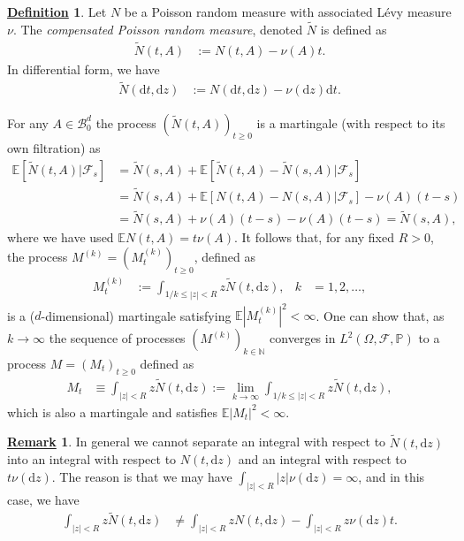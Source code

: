 \documentclass[12pt]{book}
\numberwithin{equation}{chapter}
\theoremstyle{plain}
\numberwithin{theorem}{section}
\theoremstyle{definition}
\newtheorem{definition}[theorem]{\underline{Definition}}
\newtheorem{remark}[theorem]{\underline{Remark}}
\numberwithin{exercise}{chapter}
\newcommand{\<}{\langle}
\renewcommand{\>}{\rangle}
\renewcommand{\(}{\left(}
\renewcommand{\)}{\right)}
\renewcommand{\[}{\left[}
\renewcommand{\]}{\right]}
\newcommand\Eb{\mathds{E}}
\newcommand\Pb{\mathds{P}}
\newcommand\Nb{\mathds{N}}
\newcommand\Bc{\mathscr{B}}
\newcommand\Fc{\mathscr{F}}
\newcommand\Om{\Omega}
\newcommand\Nt{\widetilde{N}}
\newcommand\dd{\mathrm{d}}
\begin{document}
\begin{definition}
Let $N$ be a Poisson random measure with associated L\'evy measure $\nu$.  The \emph{compensated Poisson random measure}, denoted $\Nt$ is defined as
\begin{align}
\Nt( t , A) 
	&:=	N( t , A) - \nu(A) t .
\end{align} 
In differential form, we have
\begin{align}
\Nt( \dd t , \dd z) 
	&:=	N( \dd t , \dd z) - \nu( \dd z) \dd t .
\end{align}
\end{definition}

\noindent
For any $A \in \Bc_0^d$ the process $(\Nt(t,A))_{t \geq 0}$ is a martingale (with respect to its own filtration) as
\begin{align}
\Eb [ \Nt(t,A) | \Fc_s ]
	&=	\Nt(s,A) + \Eb [ \Nt(t,A) - \Nt(s,A) | \Fc_s ] \\
	&=	\Nt(s,A) + \Eb [ N(t,A) - N(s,A) | \Fc_s] - \nu(A) (t - s) \\
	&=	\Nt(s,A) + \nu(A) (t-s) - \nu(A) (t-s)
	=		\Nt(s,A) ,
\end{align}
where we have used $\Eb N(t,A) = t \nu(A)$.
It follows that, for any fixed $R>0$, the process $M^{(k)}=(M_t^{(k)})_{t \geq 0}$, defined as
\begin{align}
M_t^{(k)}
	&:= \int_{1/k \leq |z| < R} z \Nt(t,\dd z) , &
k
	&=	1, 2, \ldots ,
\end{align}
is a ($d$-dimensional) martingale satisfying $\Eb |M_t^{(k)}|^2 < \infty$.  One can show that, as $k \to \infty$ the sequence of processes $(M^{(k)})_{k \in \Nb}$ converges in $L^2(\Om,\Fc,\Pb)$ to a process $M = (M_t)_{t \geq 0}$ defined as
\begin{align}
M_t
	&\equiv	\int_{ |z| < R} z \Nt(t,\dd z)
	:=	\lim_{k \to \infty} \int_{1/k \leq |z| < R} z \Nt(t,\dd z) ,
\end{align}
which is also a martingale and satisfies $\Eb |M_t|^2 < \infty$.

\begin{remark}
In general we cannot separate an integral with respect to $\Nt(t,\dd z)$ into an integral with respect to $N(t,\dd z)$ and an integral with respect to $t \nu(\dd z)$.  The reason is that we may have $\int_{|z|<R} |z| \nu(\dd z) = \infty$, and in this case, we have
\begin{align}
\int_{|z|<R} z \Nt(t,\dd z)
	&\neq \int_{|z|<R} z N(t,\dd z) - \int_{|z|<R} z \nu(\dd z) t .
\end{align}
\end{remark}
\end{document}
